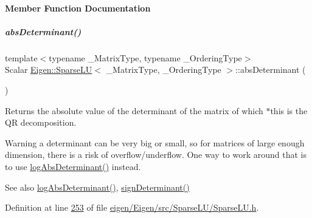 \paragraph{Member Function Documentation}
\mbox{\label{group___sparse_l_u___module_a06fa89424239fb169d408f08252426d0}} 
\subparagraph{\texorpdfstring{abs\+Determinant()}{absDeterminant()}\hspace{0.1cm}{\footnotesize\ttfamily [1/2]}}
{\footnotesize\ttfamily template$<$typename \+\_\+\+Matrix\+Type, typename \+\_\+\+Ordering\+Type$>$ \\
Scalar \hyperlink{group___sparse_l_u___module_class_eigen_1_1_sparse_l_u}{Eigen\+::\+Sparse\+LU}$<$ \+\_\+\+Matrix\+Type, \+\_\+\+Ordering\+Type $>$\+::abs\+Determinant (\begin{DoxyParamCaption}{ }\end{DoxyParamCaption})\hspace{0.3cm}{\ttfamily [inline]}}

\begin{DoxyReturn}{Returns}
the absolute value of the determinant of the matrix of which $\ast$this is the QR decomposition.
\end{DoxyReturn}
\begin{DoxyWarning}{Warning}
a determinant can be very big or small, so for matrices of large enough dimension, there is a risk of overflow/underflow. One way to work around that is to use \hyperlink{group___sparse_l_u___module_a89e30a7df205596784a5a73f4768eaec}{log\+Abs\+Determinant()} instead.
\end{DoxyWarning}
\begin{DoxySeeAlso}{See also}
\hyperlink{group___sparse_l_u___module_a89e30a7df205596784a5a73f4768eaec}{log\+Abs\+Determinant()}, \hyperlink{group___sparse_l_u___module_a6651143e3b18fa90cfb3808b6fd23c4e}{sign\+Determinant()} 
\end{DoxySeeAlso}


Definition at line \hyperlink{eigen_2_eigen_2src_2_sparse_l_u_2_sparse_l_u_8h_source_l00253}{253} of file \hyperlink{eigen_2_eigen_2src_2_sparse_l_u_2_sparse_l_u_8h_source}{eigen/\+Eigen/src/\+Sparse\+L\+U/\+Sparse\+L\+U.\+h}.

